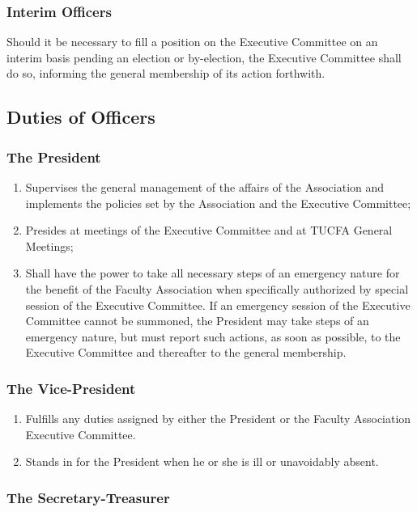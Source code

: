 \documentclass[12pt]{article}
\begin{document}
\subsubsection{Interim Officers}
Should it be necessary to fill a position on the Executive Committee on an interim basis pending an election or by-election, the Executive Committee shall do so, informing the general membership of its action forthwith.

\subsection{Duties of Officers}

\subsubsection{The President}

\begin{enumerate}
\item
Supervises the general management of the affairs of the Association and implements the policies set by the Association and the Executive Committee;
\item
Presides at meetings of the Executive Committee and at TUCFA General Meetings;
\item
Shall have the power to take all necessary steps of an emergency nature for the benefit of the Faculty Association when specifically authorized by special session of the Executive Committee. If an emergency session of the Executive Committee cannot be summoned, the President may take steps of an emergency nature, but must report such actions, as soon as possible, to the Executive Committee and thereafter to the general membership.
\end{enumerate}

\subsubsection{The Vice-President}

\begin{enumerate}
\item
Fulfills any duties assigned by either the President or the Faculty Association Executive Committee.
\item
Stands in for the President when he or she is ill or unavoidably absent.
\end{enumerate}

\subsubsection{The Secretary-Treasurer}
\end{document}
